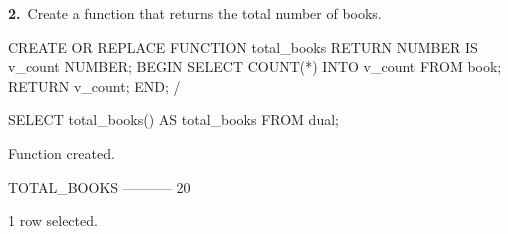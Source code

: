 \noindent\begin{minipage}{\linewidth}
\begingroup{}
{\fontsize{14}{17}\selectfont\textbf{2.}}\ Create a function that returns the total number of books.\par
\endgroup\vspace{12pt}


\begin{sqlcode}
CREATE OR REPLACE FUNCTION total_books
RETURN NUMBER
IS
   v_count NUMBER;
BEGIN
   SELECT COUNT(*) INTO v_count FROM book;
   RETURN v_count;
END;
/

SELECT total_books() AS total_books FROM dual;
\end{sqlcode}

\vspace{18pt}


\begin{sqlout}[fontsize=\small]
Function created.

TOTAL_BOOKS
-----------
         20

1 row selected.
\end{sqlout}
\end{minipage}\par\vspace{24pt}

